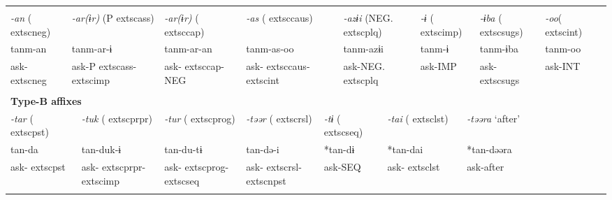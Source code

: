 \tabletail{}
\tablelasttail{}
\begin{tabularx}{\textwidth}{XXXXXXXXXXXXXXXXXXXXX}
\lsptoprule
\multicolumn{21}{X}{{\bfseries Type-A affixes}}\\
{ \textit{{}-an} (	extsc{neg})} & \multicolumn{4}{X}{{ \textit{{}-ar(ɨr)} (P	extsc{ass})}} & \multicolumn{4}{X}{{ \textit{{}-ar(ɨr)} (	extsc{cap})}} & \multicolumn{4}{X}{{ \textit{{}-as} (	extsc{caus})}} & \multicolumn{3}{X}{{ \textit{{}-azɨi} (NEG.	extsc{plq})}} & \multicolumn{2}{X}{{ \textit{{}-ɨ} (	extsc{imp})}} & { \textit{{}-ɨba} (	extsc{sugs})} & { \textit{{}-oo}(	extsc{int})} & \\
{ tanm-an} & \multicolumn{4}{X}{{ tanm-ar-ɨ}} & \multicolumn{4}{X}{{ tanm-ar-an}} & \multicolumn{4}{X}{{ tanm-as-oo}} & \multicolumn{3}{X}{{ tanm-azɨi}} & \multicolumn{2}{X}{{ tanm-ɨ}} & { tanm-ɨba} & { tanm-oo} & \\
ask-	extsc{neg} & \multicolumn{4}{X}{ask-P	extsc{ass}-	extsc{imp}} & \multicolumn{4}{X}{ask-	extsc{cap}-NEG} & \multicolumn{4}{X}{ask-	extsc{caus}-	extsc{int}} & \multicolumn{3}{X}{ask-NEG.	extsc{plq}} & \multicolumn{2}{X}{ask-IMP} & ask-	extsc{sugs} & ask-INT & \\
\multicolumn{21}{X}{}\\
\multicolumn{21}{X}{{\bfseries Type-B affixes}}\\
\multicolumn{2}{X}{{ \textit{{}-tar} (	extsc{pst})}} & \multicolumn{3}{X}{{ \textit{{}-tuk} (	extsc{prpr})}} & \multicolumn{4}{X}{{ \textit{{}-tur} (	extsc{prog})}} & \multicolumn{3}{X}{{ \textit{{}-təər} (	extsc{rsl})}} & \multicolumn{3}{X}{{ \textit{{}-tɨ} (	extsc{seq})}} & \multicolumn{2}{X}{{ \textit{{}-tai} (	extsc{lst})}} & \multicolumn{4}{X}{{ \textit{{}-təəra} ‘after’}}\\
\multicolumn{2}{X}{{ tan-da}} & \multicolumn{3}{X}{{ tan-duk-ɨ}} & \multicolumn{4}{X}{{ tan-du-tɨ}} & \multicolumn{3}{X}{{ tan-də-i}} & \multicolumn{3}{X}{{ *tan-dɨ}} & \multicolumn{2}{X}{{ *tan-dai}} & \multicolumn{4}{X}{{ *tan-dəəra}}\\
\multicolumn{2}{X}{ask-	extsc{pst}} & \multicolumn{3}{X}{ask-	extsc{prpr}-	extsc{imp}} & \multicolumn{4}{X}{ask-	extsc{prog}-	extsc{seq}} & \multicolumn{3}{X}{ask-	extsc{rsl}-	extsc{npst}} & \multicolumn{3}{X}{ask-SEQ} & \multicolumn{2}{X}{ask-	extsc{lst}} & \multicolumn{4}{X}{{ ask-after}}\\
\multicolumn{2}{X}{} & \multicolumn{3}{X}{} & \multicolumn{4}{X}{} & \multicolumn{3}{X}{} & \multicolumn{3}{X}{} & \multicolumn{2}{X}{} & \multicolumn{4}{X}{}\\

\end{tabularx}
